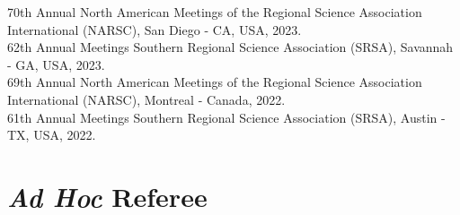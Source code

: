 \documentclass[letterpaper,11pt]{article}
\newcommand{\resumeSubHeadingListStart}{\begin{itemize}[leftmargin=0.15in, label={}]}
\newcommand{\resumeSubHeadingListEnd}{\end{itemize}}
\begin{document}
  \resumeSubHeadingListStart
    \small{\item{
        {70th Annual North American Meetings of the Regional Science Association International (NARSC), San Diego - CA, USA, 2023.} \\ \vspace{2pt}
        {62th Annual Meetings Southern Regional Science Association (SRSA), Savannah - GA, USA, 2023.} \\ \vspace{2pt}
        {69th Annual North American Meetings of the Regional Science Association International (NARSC), Montreal - Canada, 2022.} \\ \vspace{2pt}
        {61th Annual Meetings Southern Regional Science Association (SRSA), Austin - TX, USA, 2022.} \\ \vspace{2pt}
    }}
  \resumeSubHeadingListEnd


\section{\textit{Ad Hoc} Referee}
\vspace{3pt}
\end{document}
